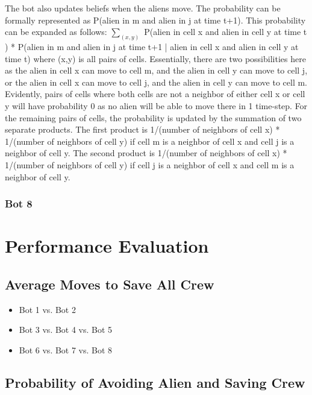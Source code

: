 \documentclass[11pt]{article}
\begin{document}
The bot also updates beliefs when the aliens move. The probability can be formally represented as P(alien in m and alien in j at time t+1). This probability can be expanded as follows: $\sum_{(x,y) }$ P(alien in cell x and alien in cell y at time t ) * P(alien in m and alien in j at time t+1 | alien in cell x and alien in cell y at time t) where (x,y) is all pairs of cells. Essentially, there are two possibilities here as the alien in cell x can move to cell m, and the alien in cell y can move to cell j, or the alien in cell x can move to cell j, and the alien in cell y can move to cell m. Evidently, pairs of cells where both cells are not a neighbor of either cell x or cell y will have probability 0 as no alien will be able to move there in 1 time-step. For the remaining pairs of cells, the probability is updated by the summation of two separate products. The first product is 1/(number of neighbors of cell x) * 1/(number of neighbors of cell y) if cell m is a neighbor of cell x and cell j is a neighbor of cell y. The second product is 1/(number of neighbors of cell x) * 1/(number of neighbors of cell y) if cell j is a neighbor of cell x and cell m is a neighbor of cell y. 


\subsubsection{Bot 8}





\section{Performance Evaluation}

\subsection{Average Moves to Save All Crew}

\begin{itemize}
    \item Bot 1 vs. Bot 2
    \item Bot 3 vs. Bot 4 vs. Bot 5
    \item Bot 6 vs. Bot 7 vs. Bot 8
\end{itemize}

\subsection{Probability of Avoiding Alien and Saving Crew}
\end{document}
